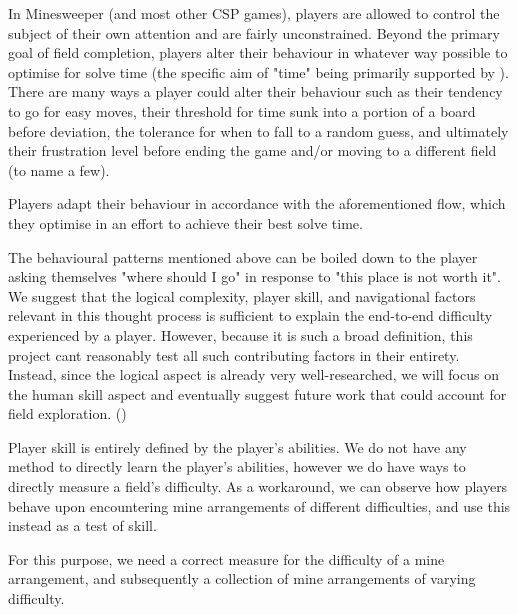 In Minesweeper (and most other CSP games), players are allowed to control the subject of their own attention and are fairly unconstrained.
Beyond the primary goal of field completion, players alter their behaviour in whatever way possible to optimise for solve time (the specific aim of "time" being primarily supported by \citet{skillChallengeBalance}).
\todoB{$\uparrow\uparrow\uparrow\uparrow\uparrow\uparrow\uparrow\uparrow\uparrow\uparrow\uparrow$}
There are many ways a player could alter their behaviour such as their tendency to go for easy moves, their threshold for time sunk into a portion of a board before deviation, the tolerance for when to fall to a random guess, and ultimately their frustration level before ending the game and/or moving to a different field (to name a few).

Players adapt their behaviour in accordance with the aforementioned flow, which they optimise in an effort to achieve their best solve time.

The behavioural patterns mentioned above can be boiled down to the player asking themselves "where should I go" in response to "this place is not worth it".
We suggest that the logical complexity, player skill, and navigational factors relevant in this thought process is sufficient to explain the end-to-end difficulty experienced by a player.
However, because it is such a broad definition, this project cant reasonably test all such contributing factors in their entirety.
Instead, since the logical aspect is already very well-researched, we will focus on the human skill aspect and eventually suggest future work that could account for field exploration.
()
\todoBA{$\uparrow\uparrow\uparrow\uparrow\uparrow\uparrow\uparrow\uparrow\uparrow\uparrow\uparrow$}

Player skill is entirely defined by the player's abilities. We do not have any method to directly learn the player's abilities,
however we do have ways to directly measure a field's difficulty.
As a workaround, we can observe how players behave upon encountering mine arrangements of different difficulties, and use this instead as a test of skill.

For this purpose, we need a correct measure for the difficulty of a mine arrangement, and subsequently a collection of mine arrangements of varying difficulty.

